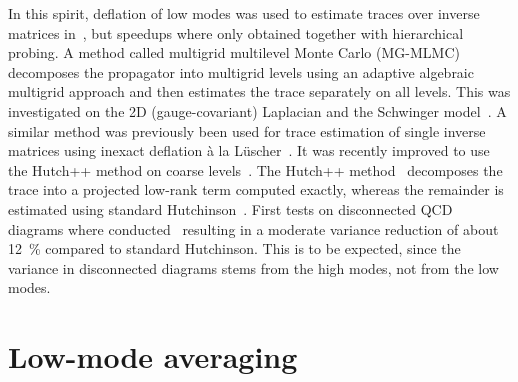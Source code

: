 In this spirit, deflation of low modes was used to estimate traces over inverse matrices in~\cite{Gambhir:2016uwp}, but speedups where only obtained together with hierarchical probing.
A method called multigrid multilevel Monte Carlo (MG-MLMC) decomposes the propagator into multigrid levels using an adaptive algebraic multigrid approach and then estimates the trace separately on all levels.
This was investigated on the 2D (gauge-covariant) Laplacian and the Schwinger model~\cite{doi:10.1137/21M1441894:2022}.
A similar method was previously been used for trace estimation of single inverse matrices using inexact deflation à la Lüscher~\cite{Romero:2019psj}.
It was recently improved to use the Hutch++ method on coarse levels~\cite{Frommer:2022qiy}.
The Hutch++ method~\cite{doi:10.1137/1.9781611976496.16:2021} decomposes the trace into a projected low-rank term computed exactly, whereas the remainder is estimated using standard Hutchinson~\cite{Hutchinson01011990}.
First tests on disconnected QCD diagrams where conducted~\cite{Frommer:2025kfp} resulting in a moderate variance reduction of about \SI{12}{\percent} compared to standard Hutchinson.
This is to be expected, since the variance in disconnected diagrams stems from the high modes, not from the low modes.


\section{Low-mode averaging}

